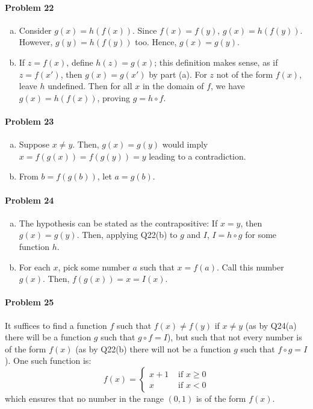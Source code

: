 \documentclass{article}
\begin{document}
\paragraph{Problem 22}
\begin{enumerate}[(a)]
  \item Consider $g(x) = h(f(x))$. Since $f(x) = f(y)$, $g(x) = h(f(y))$.
    However, $g(y) = h(f(y))$ too. Hence, $g(x) = g(y)$.
  \item If $z = f(x)$, define $h(z) = g(x)$; this definition makes sense, as if
    $z = f(x')$, then $g(x) = g(x')$ by part (a). For $z$ not of the form
    $f(x)$, leave $h$ undefined. Then for all $x$ in the domain of $f$, we have
    $g(x) = h(f(x))$, proving $g = h \circ f$.
\end{enumerate}

\paragraph{Problem 23}
\begin{enumerate}[(a)]
  \item Suppose $x \neq y$. Then, $g(x) = g(y)$ would imply $x = f(g(x)) =
    f(g(y)) = y$ leading to a contradiction.
  \item From $b = f(g(b))$, let $a = g(b)$.
\end{enumerate}

\paragraph{Problem 24}
\begin{enumerate}[(a)]
  \item The hypothesis can be stated as the contrapositive: If $x = y$, then
    $g(x) = g(y)$. Then, applying Q22(b) to $g$ and $I$, $I = h \circ g$ for
    some function $h$.
  \item For each $x$, pick some number $a$ such that $x = f(a)$. Call this
    number $g(x)$. Then, $f(g(x)) = x = I(x)$.
\end{enumerate}

\paragraph{Problem 25} It suffices to find a function $f$ such that $f(x) \neq
f(y)$ if $x \neq y$ (as by Q24(a) there will be a function $g$ such that $g
\circ f = I$), but such that not every number is of the form $f(x)$ (as by
Q22(b) there will not be a function $g$ such that $f \circ g = I$). One such
function is: \[
  f(x) =
  \begin{cases}
    x + 1 & \text{ if } x \geq 0 \\
    x     & \text{ if } x < 0
  \end{cases}
\] which ensures that no number in the range $(0, 1)$ is of the form $f(x)$.
\end{document}
